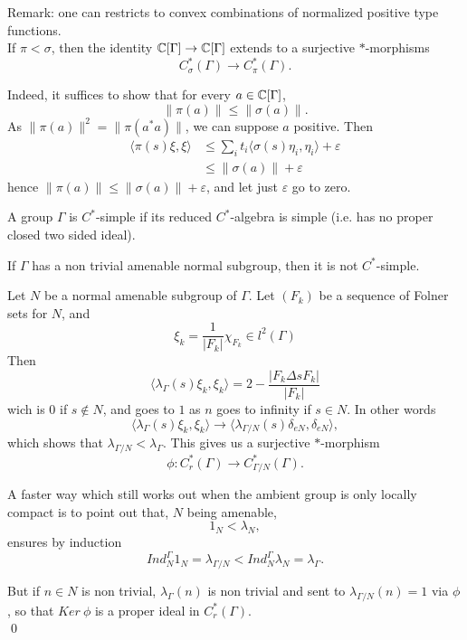 Remark: one can restricts to convex combinations of normalized positive type functions.\\ 

If $\pi < \sigma$, then the identity $\mathbb C [\Gamma] \rightarrow \mathbb C [\Gamma]$ extends to a surjective $*$-morphisms
\[C_\sigma^*(\Gamma) \rightarrow C_\pi^*(\Gamma).\]

Indeed, it suffices to show that for every $a\in \mathbb C [\Gamma]$, \[ \| \pi(a)\| \leq \| \sigma(a)\|. \]
As $\| \pi(a)\|^2 = \| \pi(a^*a)\|$, we can suppose $a$ positive. Then
\[\begin{split}
 \langle \pi(s)\xi, \xi\rangle  & \leq   \sum_i t_i \langle \sigma (s)\eta_i,\eta_i \rangle +\varepsilon \\
				& \leq \| \sigma(a)\|+ \varepsilon
\end{split}\]
hence $\| \pi(a)\| \leq \| \sigma(a)\| +\varepsilon$, and let just $\varepsilon $ go to zero.

\begin{definition}
A group $\Gamma$ is $C^*$-simple if its reduced $C^*$-algebra is simple (i.e. has no proper closed two sided ideal).
\end{definition}

\begin{thm}
If $\Gamma $ has a non trivial amenable normal subgroup, then it is not $C^*$-simple.
\end{thm}

\begin{dem}
Let $N$ be a normal amenable subgroup of $\Gamma$. Let $(F_k)$ be a sequence of Folner sets for $N$, and 
\[\xi_k =\frac{1}{|F_k|}\chi_{F_k}\in l^2(\Gamma)\]
Then
\[\langle \lambda_\Gamma(s)\xi_k, \xi_k\rangle = 2- \frac{|F_k \Delta sF_k |}{|F_k|} \]
wich is $0$ if $s\notin N$, and goes to $1$ as $n$ goes to infinity if $s\in N$. In other words
\[\langle \lambda_\Gamma(s)\xi_k, \xi_k\rangle \rightarrow \langle \lambda_{\Gamma/N}(s)\delta_{eN} , \delta_{eN} \rangle,\]
which shows that $\lambda_{\Gamma / N} < \lambda_\Gamma$. This gives us a surjective $*$-morphism 
\[\phi : C^*_r(\Gamma)\rightarrow C^*_{\Gamma/N}(\Gamma).\]

A faster way which still works out when the ambient group is only locally compact is to point out that, $N$ being amenable, 
\[1_N < \lambda_N,\]
ensures by induction 
\[Ind_N^\Gamma 1_N = \lambda_{\Gamma / N} < Ind_N^\Gamma \lambda_N= \lambda_{\Gamma }.\]

But if $n\in N$ is non trivial, $\lambda_{\Gamma}(n)$ is non trivial and sent to $\lambda_{\Gamma /N}(n) = 1$ via $\phi$, so that $Ker\ \phi$ is a proper ideal in $C^*_r(\Gamma)$.\\	
\qed	 
\end{dem}

